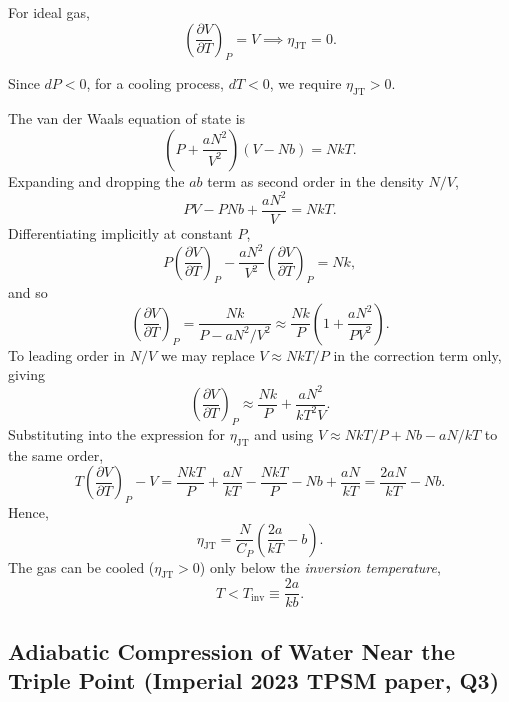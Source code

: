 For ideal gas, 
\begin{equation}
    \left(\frac{\partial V}{\partial T}\right)_P = V \implies \eta_{\text{JT}}=0.
\end{equation}

Since $dP<0$, for a cooling process, $dT<0$, we require $\eta_{\text{JT}}>0$.

The van der Waals equation of state is
\begin{equation}
    \left(P + \frac{aN^2}{V^2}\right)(V-Nb) = NkT.
\end{equation}
Expanding and dropping the $ab$ term as second order in the density $N/V$,
\begin{equation}
    PV - PNb + \frac{aN^2}{V} = NkT.
\end{equation}
Differentiating implicitly at constant $P$,
\begin{equation}
    P\left(\frac{\partial V}{\partial T}\right)_P - \frac{aN^2}{V^2}\left(\frac{\partial V}{\partial T}\right)_P = Nk,
\end{equation}
and so
\begin{equation}
    \left(\frac{\partial V}{\partial T}\right)_P = \frac{Nk}{P - aN^2/V^2} \approx \frac{Nk}{P}\left(1 + \frac{aN^2}{PV^2}\right).
\end{equation}
To leading order in $N/V$ we may replace $V \approx NkT/P$ in the correction term only, giving
\begin{equation}
    \left(\frac{\partial V}{\partial T}\right)_P \approx \frac{Nk}{P} + \frac{aN^2}{kT^2 V}.
\end{equation}
Substituting into the expression for $\eta_{\mathrm{JT}}$ and using $V \approx NkT/P + Nb - aN/kT$ to the same order,
\begin{equation}
    T\left(\frac{\partial V}{\partial T}\right)_P - V 
    = \frac{NkT}{P} + \frac{aN}{kT} - \frac{NkT}{P} - Nb + \frac{aN}{kT}
    = \frac{2aN}{kT} - Nb.
\end{equation}
Hence,
\begin{equation}
    \eta_{\mathrm{JT}} = \frac{N}{C_P}\left(\frac{2a}{kT} - b\right).
    \label{eq:JT-vdW}
\end{equation}
The gas can be cooled ($\eta_{\mathrm{JT}}>0$) only below the \textit{inversion temperature},
\begin{equation}
    T < T_{\mathrm{inv}} \equiv \frac{2a}{kb}.
\end{equation}

\subsection{Adiabatic Compression of Water Near the Triple Point (Imperial 2023 TPSM paper, Q3)}
\label{sec:water-compression}

